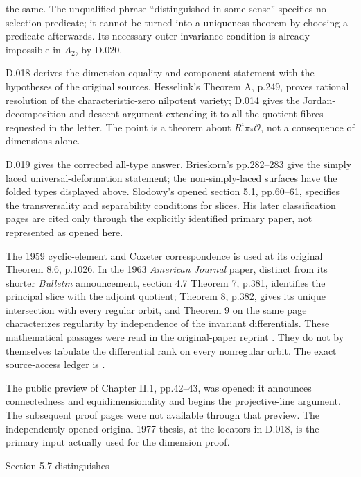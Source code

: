 \begin{description}
the same.  The unqualified phrase ``distinguished in some
sense'' specifies no selection predicate; it cannot be
turned into a uniqueness theorem by choosing a predicate
afterwards.  Its necessary outer-invariance condition is
already impossible in $A_2$, by D.020.
\item[Letter: dimensions and rational singularities.]
D.018 derives the dimension equality and component
statement with the hypotheses of the original sources.
Hesselink's Theorem A, p.249, proves rational resolution
of the characteristic-zero nilpotent variety; D.014 gives
the Jordan-decomposition and descent argument extending
it to all the quotient fibres requested in the letter.
The point is a theorem about $R^i\pi_*\mathcal O$, not a
consequence of dimensions alone.
\item[Letter: subregular uniqueness and rank.] D.019
gives the corrected all-type answer.  Brieskorn's
pp.282--283 give the simply laced universal-deformation
statement; the non-simply-laced surfaces have the folded
types displayed above.  Slodowy's opened section 5.1,
pp.60--61, specifies the transversality and separability
conditions for slices.  His later classification pages
are cited only through the explicitly identified primary
paper, not represented as opened here.
\item[Kostant 1959 and 1963.] The 1959 cyclic-element and
Coxeter correspondence is used at its original Theorem 8.6,
p.1026.  In the 1963 \emph{American Journal} paper, distinct
from its shorter \emph{Bulletin} announcement, section 4.7
Theorem 7, p.381, identifies the principal slice with the
adjoint quotient; Theorem 8, p.382, gives its unique
intersection with every regular orbit, and Theorem 9 on
the same page characterizes regularity by independence of
the invariant differentials.  These mathematical passages
were read in the original-paper reprint \cite{D-Kostant1963}.
They do not by themselves tabulate the differential rank
on every nonregular orbit.  The exact source-access ledger
is .
\item[Spaltenstein LNM 946.] The public preview of
Chapter II.1, pp.42--43, was opened: it announces
connectedness and equidimensionality and begins the
projective-line argument.  The subsequent proof pages
were not available through that preview.  The independently
opened original 1977 thesis, at the locators in D.018,
is the primary input actually used for the dimension proof.
\item[Springer IHES 30, 1966.] Section 5.7 distinguishes

\end{description}
